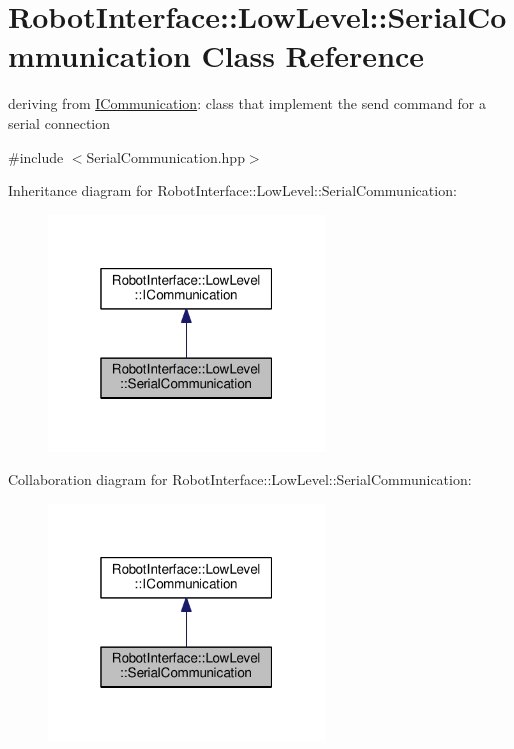 \hypertarget{classRobotInterface_1_1LowLevel_1_1SerialCommunication}{}\section{Robot\+Interface\+:\+:Low\+Level\+:\+:Serial\+Communication Class Reference}
\label{classRobotInterface_1_1LowLevel_1_1SerialCommunication}


deriving from \hyperlink{classRobotInterface_1_1LowLevel_1_1ICommunication}{I\+Communication}\+: class that implement the send command for a serial connection  




{\ttfamily \#include $<$Serial\+Communication.\+hpp$>$}



Inheritance diagram for Robot\+Interface\+:\+:Low\+Level\+:\+:Serial\+Communication\+:
\nopagebreak
\begin{figure}[H]
\begin{center}
\leavevmode
\includegraphics[width=208pt]{classRobotInterface_1_1LowLevel_1_1SerialCommunication__inherit__graph}
\end{center}
\end{figure}


Collaboration diagram for Robot\+Interface\+:\+:Low\+Level\+:\+:Serial\+Communication\+:
\nopagebreak
\begin{figure}[H]
\begin{center}
\leavevmode
\includegraphics[width=208pt]{classRobotInterface_1_1LowLevel_1_1SerialCommunication__coll__graph}
\end{center}
\end{figure}
